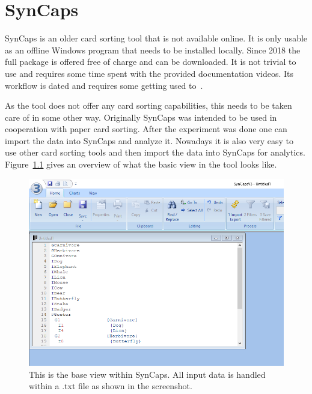 \chapter{SynCaps}

\label{chap:SynCaps}

SynCaps is an older card sorting tool that is not available online. It
is only usable as an offline Windows program that needs to be 
installed locally. Since 2018 the full package is offered free of 
charge and can be downloaded. It is not trivial to use and requires 
some time spent with the provided documentation videos. Its workflow
is dated and requires some getting used to~\parencite{SynCaps}.

As the tool does not offer any card sorting capabilities, this needs
to be taken care of in some other way. Originally SynCaps was intended
to be used in cooperation with paper card sorting. After the
experiment was done one can import the data into SynCaps and analyze
it. Nowadays it is also very easy to use other card sorting tools and
then import the data into SynCaps for analytics. Figure~\ref{fig:SynCaps1}
gives an overview of what the basic view in the tool looks like.

\begin{figure}[tp] 
\centering
\includegraphics[keepaspectratio,width=\linewidth,height=\halfh]{images/syncaps-sorting.png}
\caption[SynCaps Application] { This is the base view within SynCaps.
All input data is handled within a .txt file as shown in the screenshot.
 }
\label{fig:SynCaps1}
\end{figure}

